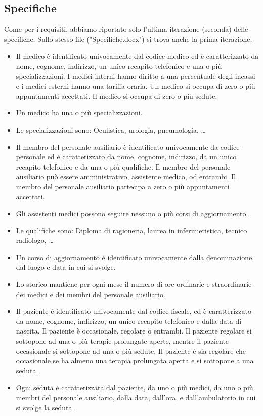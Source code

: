 \documentclass[11pt,a4paper]{article}
\begin{document}
\subsection{Specifiche}
Come per i requisiti, abbiamo riportato solo l'ultima iterazione (seconda) delle specifiche.
Sullo stesso file ("Specifiche.docx") si trova anche la prima iterazione.
\begin{itemize}
    \item Il medico è identificato univocamente dal codice-medico ed è caratterizzato da nome, cognome, indirizzo, un unico recapito telefonico e una o più specializzazioni. I medici interni hanno diritto a una percentuale degli incassi e i medici esterni hanno una tariffa oraria. Un medico si occupa di zero o più appuntamenti accettati. Il medico si occupa di zero o più sedute.
    \item Un medico ha una o più specializzazioni.
    \item Le specializzazioni sono: Oculistica, urologia, pneumologia, …
    \item Il membro del personale ausiliario è identificato univocamente da codice-personale ed è caratterizzato da nome, cognome, indirizzo, da un unico recapito telefonico e da una o più qualifiche. Il membro del personale ausiliario può essere amministrativo, assistente medico, od entrambi. Il membro del personale ausiliario partecipa a zero o più appuntamenti accettati.
    \item Gli assistenti medici possono seguire nessuno o più corsi di aggiornamento.
    \item Le qualifiche sono: Diploma di ragioneria, laurea in infermieristica, tecnico radiologo, …
    \item Un corso di aggiornamento è identificato univocamente dalla denominazione, dal luogo e data in cui si svolge.
    \item Lo storico mantiene per ogni mese il numero di ore ordinarie e straordinarie dei medici e dei membri del personale ausiliario.
    \item Il paziente è identificato univocamente dal codice fiscale, ed è caratterizzato da nome, cognome, indirizzo, un unico recapito telefonico e dalla data di nascita. Il paziente è occasionale, regolare o entrambi. Il paziente regolare si sottopone ad una o più terapie prolungate aperte, mentre il paziente occasionale si sottopone ad una o più sedute. Il paziente è sia regolare che occasionale se ha almeno una terapia prolungata aperta e si sottopone a una seduta.
    \item Ogni seduta è caratterizzata dal paziente, da uno o più medici, da uno o più membri del personale ausiliario, dalla data, dall’ora, e dall’ambulatorio in cui si svolge la seduta.

\end{itemize}
\end{document}
